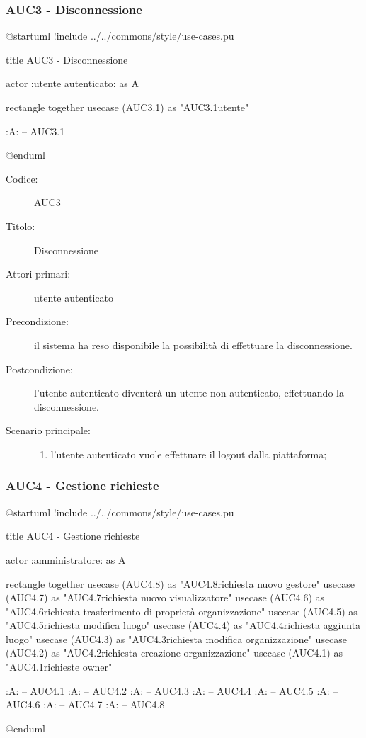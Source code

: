 \documentclass[casi-duso]{subfiles}
\begin{document}
\subsubsection{AUC3 - Disconnessione}%
\label{subsub:AUC3}

\begin{plantuml}
@startuml
!include ../../commons/style/use-cases.pu

title AUC3 - Disconnessione

actor :utente autenticato: as A

rectangle {
  together {
    usecase (AUC3.1) as "AUC3.1\nDisconnessione utente"
  }
}

:A: -- AUC3.1

@enduml
\end{plantuml}

\begin{description}
  \item[Codice:] AUC3
  \item[Titolo:] Disconnessione
  \item[Attori primari:] utente autenticato
  \item[Precondizione:] il sistema ha reso disponibile la possibilità di effettuare la disconnessione.
  \item[Postcondizione:] l'utente autenticato diventerà un utente non autenticato, effettuando la disconnessione.
  \item[Scenario principale:] 
  \begin{enumerate}
    \item l'utente autenticato vuole effettuare il logout dalla piattaforma;
  \end{enumerate}
\end{description}


\subsubsection{AUC4 - Gestione richieste}%
\label{subsub:AUC4}

\begin{plantuml}
@startuml
!include ../../commons/style/use-cases.pu

title AUC4 - Gestione richieste

actor :amministratore: as A

rectangle {
  together {
    usecase (AUC4.8) as "AUC4.8\nGestione richiesta nuovo gestore"
    usecase (AUC4.7) as "AUC4.7\nGestione richiesta nuovo visualizzatore"
    usecase (AUC4.6) as "AUC4.6\nGestione richiesta trasferimento di proprietà organizzazione"
    usecase (AUC4.5) as "AUC4.5\nGestione richiesta modifica luogo"
    usecase (AUC4.4) as "AUC4.4\nGestione richiesta aggiunta luogo"
    usecase (AUC4.3) as "AUC4.3\nGestione richiesta modifica organizzazione"
    usecase (AUC4.2) as "AUC4.2\nGestione richiesta creazione organizzazione"
    usecase (AUC4.1) as "AUC4.1\nGestione richieste owner"  
  }
}

:A: -- AUC4.1
:A: -- AUC4.2
:A: -- AUC4.3
:A: -- AUC4.4
:A: -- AUC4.5
:A: -- AUC4.6
:A: -- AUC4.7
:A: -- AUC4.8

@enduml

\end{plantuml}
\end{document}
